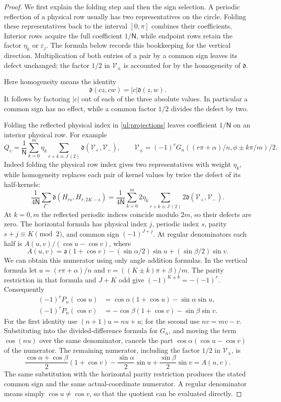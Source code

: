 \begin{proof}
We first explain the folding step and then the sign selection.  A
periodic reflection of a physical row usually has two representatives
on the circle.  Folding these representatives back to the interval
$[0,\pi]$ combines their coefficients.  Interior rows acquire the
full coefficient $1/\mathsf N$, while endpoint rows retain the
factor $\eta_k$ or $\varepsilon_j$.  The formula below records this bookkeeping
for the vertical direction.  Multiplication of both entries of a
pair by a common sign leaves its defect unchanged; the factor $1/2$
in $\mathcal V_\pm$ is accounted for by the homogeneity of $\mathfrak d$.

Here homogeneity means the identity
\[
 \mathfrak d(cz,cw)=|c|\mathfrak d(z,w).
\]
It follows by factoring $|c|$ out of each of the three absolute
values.  In particular a common sign has no effect, while a common
factor $1/2$ divides the defect by two.

Folding the reflected physical index in \eqref{ul:projections} leaves
coefficient $1/\mathsf N$ on an interior physical row.  For example
\[
 Q_v=\frac1{\mathsf N}\sum_{k=0}^m\eta_k
  \sum_{r+k\equiv J\ (2)}\mathfrak d(\mathcal V_+,\mathcal V_-),\qquad
 \mathcal V_\pm=(-1)^rG_n((r\pi+\alpha)/n,\phi\pm k\pi/m)/2.
\]
Indeed folding the physical row index gives two representatives with
weight $\eta_k$, while homogeneity replaces each pair of kernel values
by twice the defect of its half-kernels:
\[
 \frac1{4\mathsf N}\sum_{\Gamma^-}\mathfrak d(H_{rs},H_{r,2K-s})
 =\frac1{4\mathsf N}\sum_{k=0}^m2\eta_k
       \sum_{r+k\equiv J\ (2)}2\mathfrak d(\mathcal V_+,\mathcal V_-).
\]
At $k=0,m$ the reflected periodic indices coincide modulo $2m$,
so their defects are zero.
The horizontal formula has physical index $j$, periodic index $s$,
parity $s+j\equiv K\pmod2$, and common sign $(-1)^{J+j}$.
At regular denominators each half is $A(u,v)/(\cos u-\cos v)$, where
\[
 A(u,v)=\mathsf{a}(1+\cos v)-(\sin\alpha/2)\sin u+(\sin\beta/2)\sin v.
\]
We can obtain this numerator using only angle addition formulas.
In the vertical formula let $u=(r\pi+\alpha)/n$ and
$v=((K\pm k)\pi+\beta)/m$.  The parity restriction in that
formula and $J+K$ odd give
$(-1)^{K\pm k}=-(-1)^r$.  Consequently
\[
 \begin{aligned}
 (-1)^rP_n(\cos u)
    &=\cos\alpha(1+\cos u)-\sin\alpha\sin u,\\
 (-1)^rP_n(\cos v)
    &=-\cos\beta(1+\cos v)-\sin\beta\sin v.
 \end{aligned}
\]
For the first identity use $(n+1)u=nu+u$; for the second use
$nv=mv-v$.  Substituting into the divided-difference formula for
$G_n$, and moving the term $\cos(nu)$ over the same denominator,
cancels the part $\cos\alpha(\cos u-\cos v)$ of the numerator.
The remaining numerator, including the factor $1/2$ in $\mathcal V_\pm$,
is
\[
 \frac{\cos\alpha+\cos\beta}{2}(1+\cos v)
       -\frac{\sin\alpha}{2}\sin u
       +\frac{\sin\beta}{2}\sin v=A(u,v).
\]
The same substitution with the horizontal parity restriction
produces the stated common sign and the same actual-coordinate
numerator.  A regular denominator means simply
$\cos u\ne\cos v$, so that the quotient can be evaluated directly.


\end{proof}
